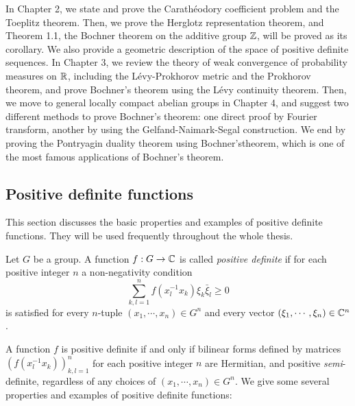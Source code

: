 \documentclass[a4paper]{article}
\begin{document}
In Chapter 2, we state and prove the Carath\'eodory coefficient problem and the Toeplitz theorem.
Then, we prove the Herglotz representation theorem, and Theorem 1.1, the Bochner theorem on the additive group $\mathbb{Z}$, will be proved as its corollary.
We also provide a geometric description of the space of positive definite sequences.
In Chapter 3, we review the theory of weak convergence of probability measures on $\mathbb{R}$, including the L\'evy-Prokhorov metric and the Prokhorov theorem, and prove Bochner's theorem using the L\'evy continuity theorem.
Then, we move to general locally compact abelian groups in Chapter 4, and suggest two different methods to prove Bochner's theorem: one direct proof by Fourier transform, another by using the Gelfand-Naimark-Segal construction.
We end by proving the Pontryagin duality theorem using Bochner'stheorem, which is one of the most famous applications of Bochner's theorem.





\subsection{Positive definite functions}
This section discusses the basic properties and examples of positive definite functions.
They will be used frequently throughout the whole thesis.

\begin{defn}
Let $G$ be a group.
A function $f:G\to\mathbb{C}$ is called \emph{positive definite} if for each positive integer $n$ a non-negativity condition
\[\sum_{k,l=1}^nf(x_l^{-1}x_k)\xi_k\bar\xi_l\ge0\]
is satisfied for every $n$-tuple $(x_1,\cdots,x_n)\in G^n$ and every vector $(\xi_1,\cdots,\xi_n)\in\mathbb{C}^n$.
\end{defn}
A function $f$ is positive definite if and only if bilinear forms defined by matrices $(f(x_l^{-1}x_k))_{k,l=1}^n$ for each positive integer $n$ are Hermitian, and positive \emph{semi}-definite, regardless of any choices of $(x_1,\cdots,x_n)\in G^n$.
We give some several properties and examples of positive definite functions:
\end{document}
